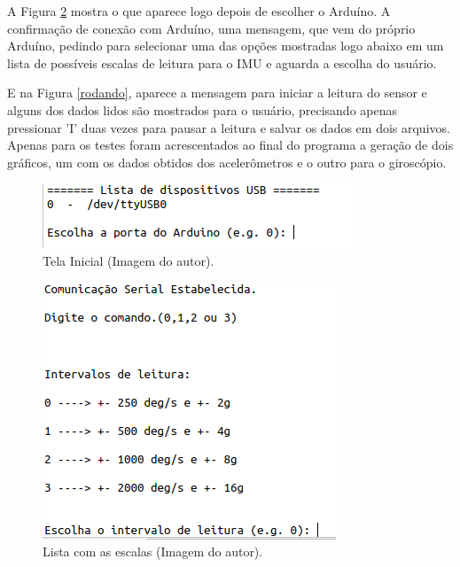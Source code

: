 	A Figura \ref{lista_ranges} mostra o que aparece logo depois de escolher o Arduíno. A confirmação de conexão com Arduíno, uma mensagem, que vem do próprio Arduíno, pedindo para selecionar uma das opções mostradas logo abaixo em um lista de possíveis escalas de leitura para o IMU e aguarda a escolha do usuário.
	
	E na Figura \ref{rodando}, aparece a mensagem para iniciar a leitura do sensor e alguns dos dados lidos são mostrados para o usuário, precisando apenas pressionar 'I' duas vezes para pausar a leitura e salvar os dados em dois arquivos. Apenas para os testes foram acrescentados ao final do programa a geração de dois gráficos, um com os dados obtidos dos acelerômetros e o outro para o giroscópio. 
	 	
	 	\begin{figure}[h!]
	 		\centering
	 		\includegraphics[keepaspectratio=true,scale=0.5]{figuras/tela_inicial.png}
	 		\caption{Tela Inicial (Imagem do autor).}
	 	
	 		\label{tela_inicial}	
	 	\end{figure}
	
	\begin{figure}[h!]
		\centering
		\includegraphics[keepaspectratio=true,scale=0.5]{figuras/lista_ranges.png}
		\caption{Lista com as escalas (Imagem do autor).}
		
		\label{lista_ranges}	
	\end{figure}
	
